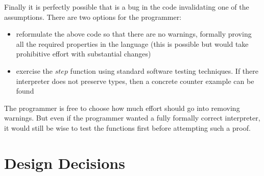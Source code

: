 Finally it is perfectly possible that is a bug in the code invalidating
one of the assumptions. There are two options for the programmer:
\begin{itemize}
\item reformulate the above code so that there are no warnings, formally
proving all the required properties in the language (this is possible
but would take prohibitive effort with substantial changes)
\item exercise the $step$ function using standard software testing techniques.
If there interpreter does not preserve types, then a concrete counter
example can be found
\end{itemize}
The programmer is free to choose how much effort should go into removing
warnings. But even if the programmer wanted a fully formally correct
interpreter, it would still be wise to test the functions first before
attempting such a proof.



\section{Design Decisions}


